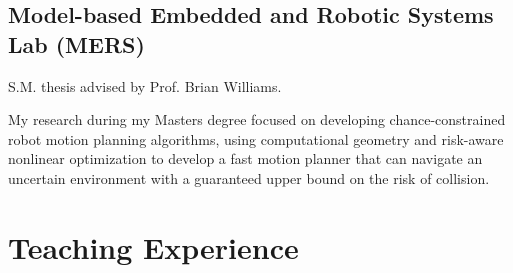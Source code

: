 \documentclass{cv_style}
\begin{document}
\subsection{Model-based Embedded and Robotic Systems Lab (MERS)}
\begin{trivlist}
    \item S.M. thesis advised by Prof. Brian Williams.

    \item My research during my Masters degree focused on developing chance-constrained robot motion planning algorithms, using computational geometry and risk-aware nonlinear optimization to develop a fast motion planner that can navigate an uncertain environment with a guaranteed upper bound on the risk of collision. 
\end{trivlist}

\section{Teaching Experience}
\end{document}
